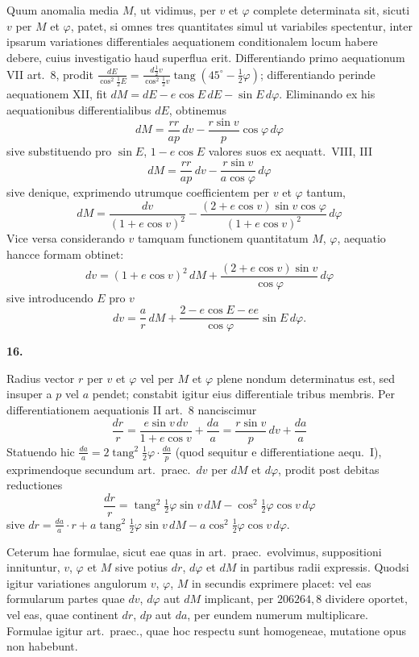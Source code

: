 \documentclass[12pt,a4paper]{book}
\newcommand{\tang}{\operatorname{tang}}
\begin{document}
Quum anomalia media $M$, ut vidimus, per $v$ et $\varphi$ complete determinata sit, sicuti $v$ per $M$ et $\varphi$, patet, si omnes tres quantitates simul ut variabiles spectentur, inter ipsarum variationes differentiales aequationem conditionalem locum habere debere, cuius investigatio haud superflua erit. Differentiando primo aequationum VII art.~8, prodit $\frac{dE}{\cos^{2}\tfrac{1}{2}E}=\frac{d\tfrac{1}{2}v}{\cos^{2}\tfrac{1}{2}v}\tang(45^{\circ}-\tfrac{1}{2}\varphi)$; differentiando perinde aequationem XII, fit $dM=dE-e\cos E\,dE-\sin E\,d\varphi$. Eliminando ex his aequationibus differentialibus $dE$, obtinemus
\[
dM=\frac{rr}{ap}\,dv-\frac{r\sin v}{p}\cos\varphi\,d\varphi
\]
sive substituendo pro $\sin E$, $1-e\cos E$ valores suos ex aequatt.~VIII, III
\[
dM=\frac{rr}{ap}\,dv-\frac{r\sin v}{a\cos\varphi}\,d\varphi
\]
sive denique, exprimendo utrumque coefficientem per $v$ et $\varphi$ tantum,
\[
dM=\frac{dv}{(1+e\cos v)^{2}}-\frac{(2+e\cos v)\sin v\cos\varphi}{(1+e\cos v)^{2}}\,d\varphi
\]
Vice versa considerando $v$ tamquam functionem quantitatum $M$, $\varphi$, aequatio hancce formam obtinet:
\[
dv=(1+e\cos v)^{2}\,dM+\frac{(2+e\cos v)\sin v}{\cos\varphi}\,d\varphi
\]
sive introducendo $E$ pro $v$
\[
dv=\frac{a}{r}\,dM+\frac{2-e\cos E-ee}{\cos\varphi}\sin E\,d\varphi.
\]

\textbf{16.}

Radius vector $r$ per $v$ et $\varphi$ vel per $M$ et $\varphi$ plene nondum determinatus est, sed insuper a $p$ vel $a$ pendet; constabit igitur eius differentiale tribus membris. Per differentiationem aequationis II art.~8 nanciscimur
\[
\frac{dr}{r}=\frac{e\sin v\,dv}{1+e\cos v}+\frac{da}{a}=\frac{r\sin v}{p}\,dv+\frac{da}{a}
\]
Statuendo hic $\frac{da}{a}=2\tang^{2}\tfrac{1}{2}\varphi\cdot\frac{da}{p}$ (quod sequitur e differentiatione aequ.~I), exprimendoque secundum art.~praec.~$dv$ per $dM$ et $d\varphi$, prodit post debitas reductiones
\[
\frac{dr}{r}=\tang^{2}\tfrac{1}{2}\varphi\sin v\,dM-\cos^{2}\tfrac{1}{2}\varphi\cos v\,d\varphi
\]
sive $dr=\frac{da}{a}\cdot r+a\tang^{2}\tfrac{1}{2}\varphi\sin v\,dM-a\cos^{2}\tfrac{1}{2}\varphi\cos v\,d\varphi$.

Ceterum hae formulae, sicut eae quas in art.~praec.~evolvimus, suppositioni innituntur, $v$, $\varphi$ et $M$ sive potius $dr$, $d\varphi$ et $dM$ in partibus radii expressis. Quodsi igitur variationes angulorum $v$, $\varphi$, $M$ in secundis exprimere placet: vel eas formularum partes quae $dv$, $d\varphi$ aut $dM$ implicant, per $206264{,}8$ dividere oportet, vel eas, quae continent $dr$, $dp$ aut $da$, per eundem numerum multiplicare. Formulae igitur art.~praec., quae hoc respectu sunt homogeneae, mutatione opus non habebunt.
\end{document}
